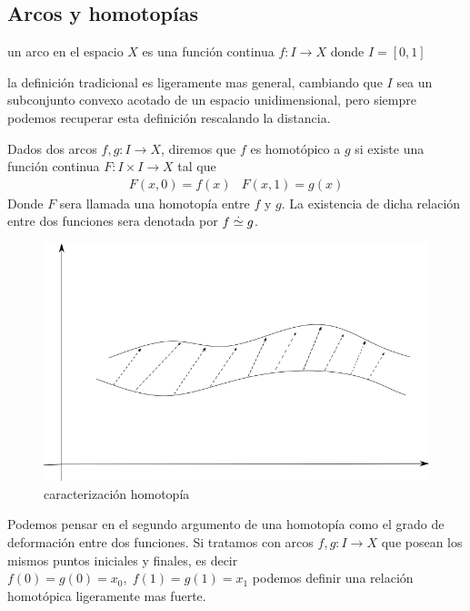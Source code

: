 \subsection{Arcos y homotopías}
\begin{definicion}[Arco]
  un arco en el espacio \(X\) es una función continua \(f : I \to X \)
  donde \(I = [0,1]\)
\end{definicion}
la definición tradicional es ligeramente mas general, cambiando que \(I\)
sea un subconjunto convexo acotado de un espacio unidimensional, pero
siempre podemos recuperar esta definición rescalando la distancia.

\begin{definicion}[Homotopía]
  Dados dos arcos \(f,g : I \to X\), diremos que \(f\) es homotópico a
  \(g\) si existe una función continua \(F : I \times I \to X \) tal que
  \[ \begin{matrix}
      F (x, 0) = f(x) & F (x, 1) = g(x)
     \end{matrix}
  \]
  Donde \(F\) sera llamada una homotopía entre \(f\) y \(g\). La
  existencia de dicha relación entre dos funciones sera denotada por \(f
  \stackrel{.}{\simeq} g\).
\end{definicion}
\begin{figure}[h]
  \centering
  \includegraphics[scale=0.3]{./imagenes/homotopia.png}
  \caption{caracterización homotopía}
  \label{fig:homotopia-entre-funciones}
\end{figure}
Podemos pensar en el segundo argumento de una homotopía como el grado de
deformación entre dos funciones.
Si tratamos con arcos \(f,g : I \to X\) que posean los mismos puntos
iniciales y finales, es decir \(f(0) = g(0) = x_0, \; f(1) = g(1) =
x_1 \) podemos definir una relación homotópica ligeramente mas fuerte.

